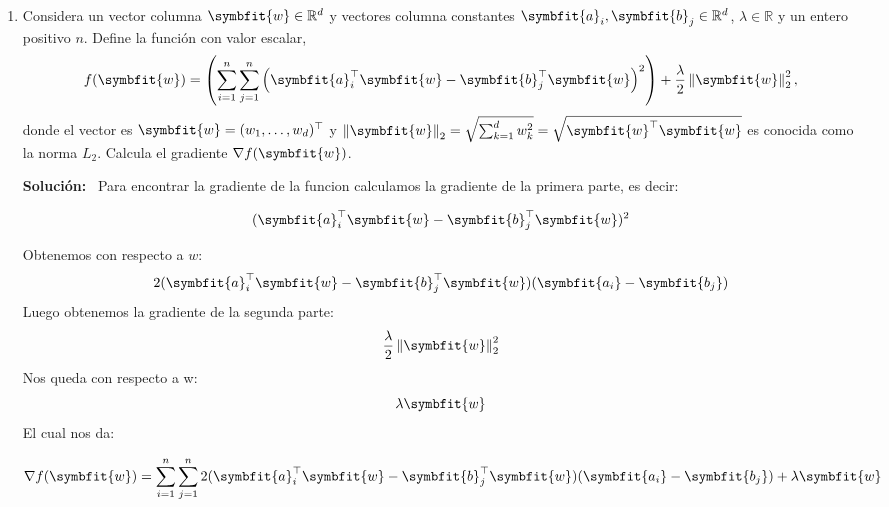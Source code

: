 \documentclass[11pt,letterpaper]{article}
\newenvironment{solution}{%
  \noindent\begin{shaded}
  \textbf{Solución:}\ }{
  \end{shaded}%
}
\newcommand{\bvec}[1]{\symbfit{#1}}
\newcommand{\norm}[1]{\left\lVert#1\right\rVert}
\begin{document}
\begin{enumerate}
\begin{solution}
Tenemos la probabilidad condicional:

\(P(A \mid B)
  = \frac{P(A \cap B)}{P(B)}\)

\(P(B \mid A)
  = \frac{P(A \cap B)}{P(A)}\)

\(P(A \mid B)
  = P(B \mid A)\)

\(P(B) = P(A)\)

Utilizando la formula de la probabilidad de la union de los dos eventos obtenemos:

\(P(A \cup B) = P(A) + P(B) - P(A \cap B)\)
\(P(A \cup B) = \frac{1}{3}\)
\(P(A \cap B) > 0\)
\(\frac{1}{3} = P(A) + P(A) - P(A \cap B)\)
\(\frac{1}{3} = 2P(A) - P(A \cap B)\)

Como \(P(A \cap B) > 0\)  Tenemos que \(2P(A) > \frac{1}{3}\)
Por lo tanto \(P(A) > \frac{1}{6}\)
  \end{solution}
  
\item%
  Considera un vector columna \(\bvec{w}\in\mathbb{R}^d\) y vectores
  columna constantes \(\bvec{a}_i,\bvec{b}_j\in\mathbb{R}^d\),
  \(\lambda\in\mathbb{R}\) y un entero positivo \(n\).  Define la
  función con valor escalar,
  \[ f(\bvec{w})=\left(\sum_{i=1}^n\sum_{j=1}^n\left(\bvec{a}_i^\top\bvec{w}-\bvec{b}_j^\top\bvec{w}\right)^2\right)+\frac{\lambda}{2}\norm{\bvec{w}}_2^2, \]
  donde el vector es \(\bvec{w} = (w_1,\dots,w_d)^\top\) y
  \(\norm{\bvec{w}}_2 = \sqrt{\sum_{k=1}^d w_k^2} =
  \sqrt{\bvec{w}^\top\bvec{w}}\) es conocida como la norma \(L_2\).
  Calcula el gradiente \(\nabla f(\bvec{w})\).
  \begin{solution}
    Para encontrar la gradiente de la funcion calculamos la gradiente de la primera parte, es decir:

\[(\bvec{a}_i^\top\bvec{w}-\bvec{b}_j^\top\bvec{w})^2\]

Obtenemos con respecto a \(w\):
\[2(\bvec{a}_i^\top\bvec{w}-\bvec{b}_j^\top\bvec{w})(\bvec{a_i} - \bvec{b_j})\]
Luego obtenemos la gradiente de la segunda parte:
\[\frac{\lambda}{2}\norm{\bvec{w}}_2^2\]
Nos queda con respecto a w:
\[\lambda \bvec{w}\]
El cual nos da:

\[\nabla f(\bvec{w}) = \sum_{i=1}^n\sum_{j=1}^n 2(\bvec{a}_i^\top\bvec{w}-\bvec{b}_j^\top\bvec{w})(\bvec{a_i} - \bvec{b_j}) + \lambda \bvec{w}\]
  \end{solution}
\end{enumerate}


\end{document}
